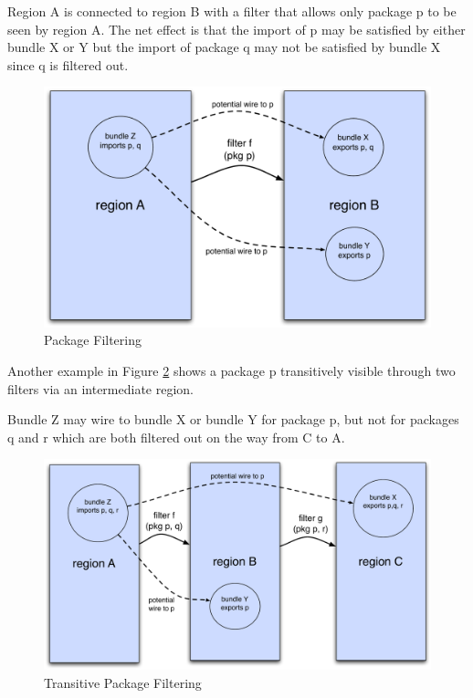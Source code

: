 \documentclass[a4paper,9pt,twoside]{article}
\begin{document}
Region A is connected to region B with a filter that allows only package p to be seen by region A.
The net effect is that the import of p may be satisfied by either bundle X or Y but the import of package q may not
be satisfied by bundle X since q is filtered out.
\begin{figure}[h!]
\begin{center}
\includegraphics*[scale=0.4]{package-filtering.pdf}
\caption{Package Filtering \label{fig:pfilt}}
\end{center}
\end{figure}

Another example in Figure \ref{fig:tpfilt} shows a package p transitively visible through two filters via an
intermediate region.

Bundle Z may wire to bundle X or bundle Y for package p, but not for packages q and r which are both
filtered out on the way from C to A.
\begin{figure}[h!]
\begin{center}
\includegraphics*[scale=0.4]{transitive-package-filtering.pdf}
\caption{Transitive Package Filtering \label{fig:tpfilt}}
\end{center}
\end{figure}
\end{document}
